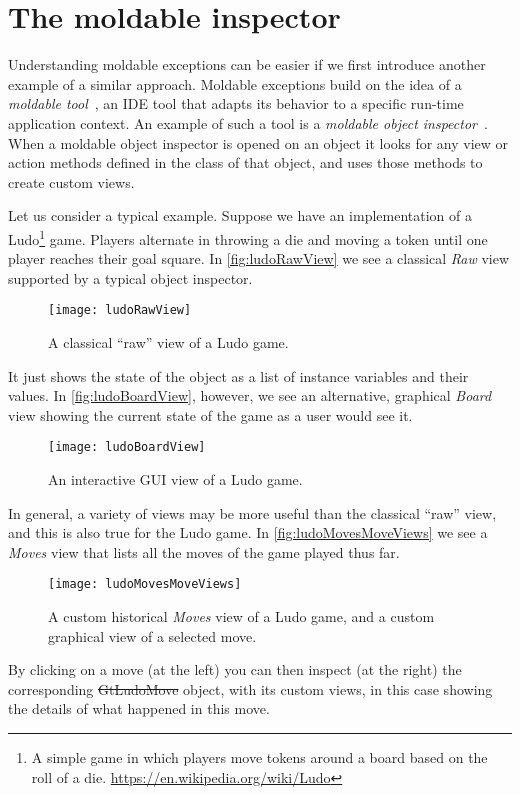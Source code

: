 \documentclass[sigplan,anonymous,review,10pt]{acmart}
\begin{document}
\section{The moldable inspector}\label{sec:inspectorViews}

Understanding moldable exceptions can be easier if we first introduce another example of a similar approach.
Moldable exceptions build on the idea of a \emph{moldable tool}~\cite{Chis17a}, an IDE tool that adapts its behavior to a specific run-time application context.
An example of such a tool is a \emph{moldable object inspector}~\cite{Chis15a}.
When a moldable object inspector is opened on an object it looks for any view or action methods defined in the class of that object, and uses those methods to create custom views.

Let us consider a typical example.
Suppose we have an implementation of a Ludo\footnote{A simple game in which players move tokens around a board based on the roll of a die.
\url{https://en.wikipedia.org/wiki/Ludo}} game.
Players alternate in throwing a die and moving a token until one player reaches their goal square.
In \autoref{fig:ludoRawView} we see a classical \emph{Raw} view supported by a typical object inspector.
\begin{figure}[h]
  \texttt{[image: ludoRawView]}
  \caption{A classical ``raw'' view of a Ludo game.}
  \label{fig:ludoRawView}
\end{figure}
It just shows the state of the object as a list of instance variables and their values.
In \autoref{fig:ludoBoardView}, however, we see an alternative, graphical \emph{Board} view showing the current state of the game as a user would see it.
\begin{figure}[h]
  \texttt{[image: ludoBoardView]}
  \caption{An interactive GUI view of a Ludo game.}
  \label{fig:ludoBoardView}
\end{figure}

In general, a variety of views may be more useful than the classical ``raw'' view, and this is also true for the Ludo game.
In \autoref{fig:ludoMovesMoveViews} we see a \emph{Moves} view that lists all the moves of the game played thus far.
\begin{figure}[h]
  \texttt{[image: ludoMovesMoveViews]}
  \caption{A custom historical \emph{Moves} view of a Ludo game, and a custom graphical view of a selected move.}
  \label{fig:ludoMovesMoveViews}
\end{figure}
By clicking on a move (at the left) you can then inspect (at the right) the corresponding \st{GtLudoMove} object, with its custom views, in this case showing the details of what happened in this move.
\end{document}

